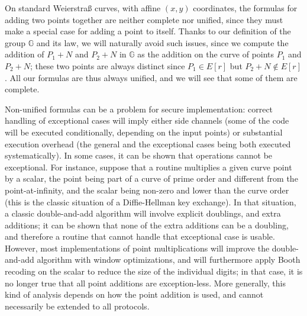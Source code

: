\documentclass{llncs}
\newcommand{\bG}{\mathbb{G}}
\begin{document}
On standard Weierstraß curves, with affine $(x,y)$ coordinates, the
formulas for adding two points together are neither complete nor
unified, since they must make a special case for adding a point to
itself. Thanks to our definition of the group $\bG$ and its law, we will
naturally avoid such issues, since we compute the addition of $P_1+N$
and $P_2+N$ in $\bG$ as the addition on the curve of points $P_1$ and
$P_2+N$; these two points are always distinct since $P_1 \in E[r]$ but
$P_2+N \notin E[r]$. All our formulas are thus always unified, and we
will see that some of them are complete.

Non-unified formulas can be a problem for secure implementation: correct
handling of exceptional cases will imply either side channels (some of
the code will be executed conditionally, depending on the input points)
or substantial execution overhead (the general and the exceptional cases
being both executed systematically). In some cases, it can be shown that
operations cannot be exceptional. For instance, suppose that a routine
multiplies a given curve point by a scalar, the point being part of a
curve of prime order and different from the point-at-infinity, and the
scalar being non-zero and lower than the curve order (this is the
classic situation of a Diffie-Hellman key exchange). In that situation,
a classic double-and-add algorithm will involve explicit doublings, and
extra additions; it can be shown that none of the extra additions can be
a doubling, and therefore a routine that cannot handle that exceptional
case is usable. However, most implementations of point multiplications
will improve the double-and-add algorithm with window optimizations, and
will furthermore apply Booth recoding on the scalar\cite{Boo1951} to
reduce the size of the individual digits; in that case, it is no longer
true that all point additions are exception-less. More generally, this
kind of analysis depends on how the point addition is used, and cannot
necessarily be extended to all protocols.
\end{document}
